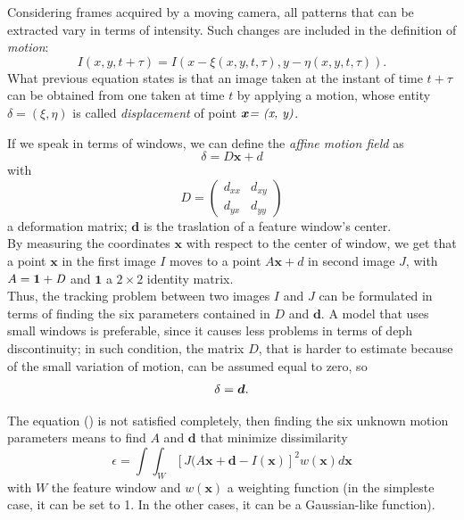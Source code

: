 \documentclass[a4paper, onecolumn]{report}
\begin{document}
Considering frames acquired by a moving camera, all patterns that can be extracted vary in terms of intensity. Such changes are included in the definition of \emph{motion}:
\begin{equation}
	I(x, y, t+\tau) = I(x-\xi(x,y,t,\tau), y - \eta(x,y,t,\tau)).
\end{equation}
What previous equation states is that an image taken at the instant of time $t+\tau$ can be obtained from one taken at time $t$ by applying a motion, whose entity $\delta = (\xi, \eta)$ is called \emph{displacement} of point $\boldsymbol{x}\emph{= (x, y)}$.

If we speak in terms of windows, we can define the \emph{affine motion field} as 
\begin{equation}
	\delta = D\boldsymbol{x} + d
\end{equation}
with
\begin{equation}
	D = \left(\begin{matrix}d_{xx} & d_{xy} \\ d_{yx} & d_{yy}\end{matrix}\right)
\end{equation}
a deformation matrix; $\boldsymbol{d}$ is the traslation of a feature window's center. \\ 
By measuring the coordinates $\boldsymbol{x}$ with respect to the center of window, we get that a point $\boldsymbol{x}$ in the first image $I$ moves to a point $A\boldsymbol{x} + d$ in second image $J$, with $A=\boldsymbol{1} + \emph{D}$ and $\boldsymbol{1}$ a $2 \times 2$ identity matrix. \\
Thus, the tracking problem between two images $I$ and $J$ can be formulated in terms of finding the six parameters contained in $D$ and $\boldsymbol{d}$. A model that uses small windows is preferable, since it causes less problems in terms of deph discontinuity; in such condition, the matrix $D$, that is harder to estimate because of the small variation of motion, can be assumed equal to zero, so
\begin{equation}
	\delta = \boldsymbol{d}. \notag
\end{equation}

The equation () is not satisfied completely, then finding the six unknown motion parameters means to find $A$ and $\boldsymbol{d}$ that minimize dissimilarity
\begin{equation}
	\epsilon = \int \int_W [J(A\boldsymbol{x} + \boldsymbol{d} - I(\boldsymbol{x})]^2 w(\boldsymbol{x})d\boldsymbol{x}
\end{equation}
with $W$ the feature window and $w(\boldsymbol{x})$ a weighting function (in the simpleste case, it can be set to 1. In the other cases, it can be a Gaussian-like function).
\end{document}
